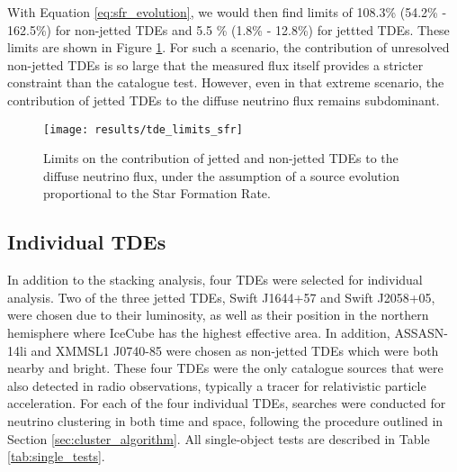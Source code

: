With Equation \ref{eq:sfr_evolution}, we would then find limits of 108.3\% (54.2\% - 162.5\%) for non-jetted TDEs and 5.5 \% (1.8\% - 12.8\%) for jettted TDEs. These limits are shown in Figure \ref{fig:DiffuseFluxSFR}. For such a scenario, the contribution of unresolved non-jetted TDEs is so large that the measured flux itself provides a stricter constraint than the catalogue test. However, even in that extreme scenario, the contribution of jetted TDEs to the diffuse neutrino flux remains subdominant.

\begin{figure}[!ht]
	\centering \texttt{[image: results/tde\_limits\_sfr]}
	\caption{Limits on the contribution of jetted and non-jetted TDEs to the diffuse neutrino flux, under the assumption of a source evolution proportional to the Star Formation Rate.}
	\label{fig:DiffuseFluxSFR}
\end{figure}

\subsection*{Individual TDEs}

In addition to the stacking analysis, four TDEs were selected for individual analysis. Two of the three jetted TDEs, Swift J1644+57 and Swift J2058+05, were chosen due to their luminosity, as well as their position in the northern hemisphere where IceCube has the highest effective area. In addition, ASSASN-14li and  XMMSL1 J0740-85 were chosen as non-jetted TDEs which were both nearby and bright. These four TDEs were the only catalogue sources that were also detected in radio observations, typically a tracer for relativistic particle acceleration. For each of the four individual TDEs, searches were conducted for neutrino clustering in both time and space, following the procedure outlined in Section \ref{sec:cluster_algorithm}. All single-object tests are described in Table \ref{tab:single_tests}.

